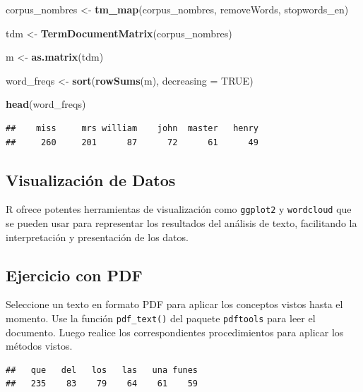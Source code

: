 \documentclass[
]{article}
\newenvironment{Shaded}{\begin{snugshade}}{\end{snugshade}}
\newcommand{\AttributeTok}[1]{\textcolor[rgb]{0.13,0.29,0.53}{#1}}
\newcommand{\ConstantTok}[1]{\textcolor[rgb]{0.56,0.35,0.01}{#1}}
\newcommand{\FunctionTok}[1]{\textcolor[rgb]{0.13,0.29,0.53}{\textbf{#1}}}
\newcommand{\NormalTok}[1]{#1}
\newcommand{\OtherTok}[1]{\textcolor[rgb]{0.56,0.35,0.01}{#1}}
\begin{document}
\begin{Shaded}
\begin{Highlighting}[]
\NormalTok{corpus\_nombres }\OtherTok{\textless{}{-}} \FunctionTok{tm\_map}\NormalTok{(corpus\_nombres, removeWords, stopwords\_en)}

\NormalTok{tdm }\OtherTok{\textless{}{-}} \FunctionTok{TermDocumentMatrix}\NormalTok{(corpus\_nombres)}

\NormalTok{m }\OtherTok{\textless{}{-}} \FunctionTok{as.matrix}\NormalTok{(tdm)}

\NormalTok{word\_freqs }\OtherTok{\textless{}{-}} \FunctionTok{sort}\NormalTok{(}\FunctionTok{rowSums}\NormalTok{(m), }\AttributeTok{decreasing =} \ConstantTok{TRUE}\NormalTok{)}

\FunctionTok{head}\NormalTok{(word\_freqs)}
\end{Highlighting}
\end{Shaded}

\begin{verbatim}
##    miss     mrs william    john  master   henry 
##     260     201      87      72      61      49
\end{verbatim}

\hypertarget{visualizaciuxf3n-de-datos}{%
\subsection{Visualización de Datos}\label{visualizaciuxf3n-de-datos}}

R ofrece potentes herramientas de visualización como \texttt{ggplot2} y
\texttt{wordcloud} que se pueden usar para representar los resultados
del análisis de texto, facilitando la interpretación y presentación de
los datos.

\hypertarget{ejercicio-con-pdf}{%
\subsection{Ejercicio con PDF}\label{ejercicio-con-pdf}}

Seleccione un texto en formato PDF para aplicar los conceptos vistos
hasta el momento. Use la función \texttt{pdf\_text()} del paquete
\texttt{pdftools} para leer el documento. Luego realice los
correspondientes procedimientos para aplicar los métodos vistos.

\begin{verbatim}
##   que   del   los   las   una funes 
##   235    83    79    64    61    59
\end{verbatim}
\end{document}
